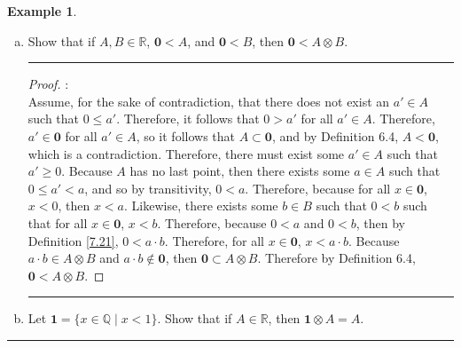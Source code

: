 \documentclass[openany, amssymb, psamsfonts]{amsart}
\newcommand{\bbQ}{\mathbb{Q}}
\newcommand{\bbR}{\mathbb{R}}
\theoremstyle{definition}
\newtheorem{exmp}{Example}[section]
\numberwithin{equation}{section}
\begin{document}
\begin{exmp}
\begin{enumerate}[(a)]
\begin{proof}
\begin{enumerate}
\begin{enumerate}
        \item For any $A,B,C$, then using the same method as 7.40.b.a.ii-7.40.b.a.iv, $\otimes$ is associative.
    \end{enumerate}
Therefore $(A\otimes B) \otimes C = A\otimes (B \otimes C)$
\end{enumerate}
\end{proof}
\vspace{4pt}     \hrule   \vspace{4pt}
		\item Show that if $A, B \in \bbR$, $\mathbf{0} < A$, and $\mathbf{0} < B$, then $\mathbf{0} < A\otimes B$. 
  \vspace{4pt}     \hrule   \vspace{4pt}
  \begin{proof}:\\
  Assume, for the sake of contradiction, that there does not exist an $a'\in A$ such that $0\leq a'$. Therefore, it follows that $0>a'$ for all $a'\in A$. Therefore, $a'\in \textbf{0}$ for all $a'\in A$, so it follows that $A\subset \textbf{0}$, and by Definition 6.4, $A<\textbf{0}$, which is a contradiction. Therefore, there must exist some $a'\in A$ such that $a'\geq 0$. Because $A$ has no last point, then there exists some $a\in A$ such that $0\leq a' <a$, and so by transitivity, $0<a$. Therefore, because for all $x\in \textbf{0}$, $x< 0$, then $x<a$. Likewise, there exists some $b\in B$ such that $0<b$ such that for all $x\in \textbf{0}$, $x<b$. Therefore, because $0<a$ and $0<b$, then by Definition \ref{7.21}, $0<a\cdot b$. Therefore, for all $x\in \textbf{0}$, $x< a\cdot b$. Because $a\cdot b \in A\otimes B$ and $a\cdot b \notin \textbf{0}$, then $\textbf{0}\subset A\otimes B$. Therefore by Definition 6.4, $\textbf{0}< A\otimes B$.
  \end{proof}
\vspace{4pt}     \hrule   \vspace{4pt}
		\item Let $\mathbf{1} = \{x \in \bbQ \mid x < 1\}$. Show that if $A \in \bbR$, then $\mathbf{1} \otimes A = A$. 
	\end{enumerate}
\end{exmp}
\vspace{4pt}     \hrule   \vspace{4pt}
\end{document}
